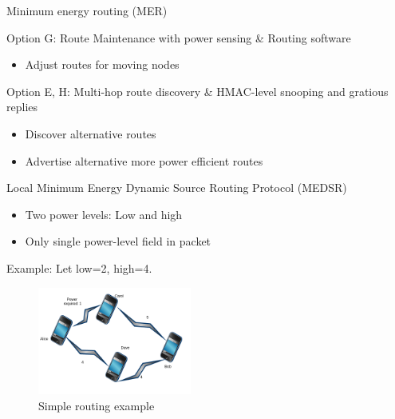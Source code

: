 \documentclass{beamer}
\begin{document}
\begin{frame}{Minimum energy routing (MER)}
    \begin{block}{Option G: Route Maintenance with power sensing \& Routing software}
    \begin{itemize}
        \item Adjust routes for moving nodes
    \end{itemize}
\end{block}

\begin{block}{Option E, H: Multi-hop route discovery \& HMAC-level snooping and gratious replies}
    \begin{itemize}
        \item Discover alternative routes
        \item Advertise alternative more power efficient routes
    \end{itemize}
\end{block}
\end{frame}

\begin{frame}{Local Minimum Energy Dynamic Source Routing Protocol (MEDSR)\cite{tanque2007minimum}}
    \begin{itemize}
        \item Two power levels: Low and high
        \item Only single power-level field in packet
    \end{itemize}
    Example: Let low=2, high=4.
    \begin{figure}
\centering
\includegraphics[width=0.45\textwidth]{images/far}
\caption{Simple routing example}
\end{figure}
\end{frame}
\end{document}
